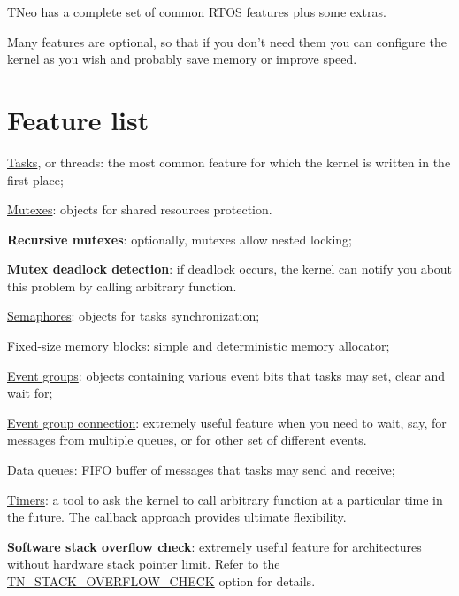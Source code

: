 T\+Neo has a complete set of common R\+T\+O\+S features plus some extras.

Many features are optional, so that if you don't need them you can configure the kernel as you wish and probably save memory or improve speed.\hypertarget{features_feature_list}{}\section{Feature list}\label{features_feature_list}

\begin{DoxyItemize}
\item \hyperlink{tn__tasks_8h}{Tasks}, or threads\+: the most common feature for which the kernel is written in the first place;
\item \hyperlink{tn__mutex_8h}{Mutexes}\+: objects for shared resources protection.
\begin{DoxyItemize}
\item {\bfseries Recursive mutexes}\+: optionally, mutexes allow nested locking;
\item {\bfseries Mutex deadlock detection}\+: if deadlock occurs, the kernel can notify you about this problem by calling arbitrary function.
\end{DoxyItemize}
\item \hyperlink{tn__sem_8h}{Semaphores}\+: objects for tasks synchronization;
\item \hyperlink{tn__fmem_8h}{Fixed-\/size memory blocks}\+: simple and deterministic memory allocator;
\item \hyperlink{tn__eventgrp_8h}{Event groups}\+: objects containing various event bits that tasks may set, clear and wait for;
\begin{DoxyItemize}
\item \hyperlink{tn__eventgrp_8h_eventgrp_connect}{Event group connection}\+: extremely useful feature when you need to wait, say, for messages from multiple queues, or for other set of different events.
\end{DoxyItemize}
\item \hyperlink{tn__dqueue_8h}{Data queues}\+: F\+I\+F\+O buffer of messages that tasks may send and receive;
\item \hyperlink{tn__timer_8h}{Timers}\+: a tool to ask the kernel to call arbitrary function at a particular time in the future. The callback approach provides ultimate flexibility.
\item {\bfseries Software stack overflow check}\+: extremely useful feature for architectures without hardware stack pointer limit. Refer to the {\ttfamily \hyperlink{tn__cfg__default_8h_ac6a9bbac3b3b25d9b5bc8c21d2e09955}{T\+N\+\_\+\+S\+T\+A\+C\+K\+\_\+\+O\+V\+E\+R\+F\+L\+O\+W\+\_\+\+C\+H\+E\+C\+K}} option for details.

\end{DoxyItemize}
